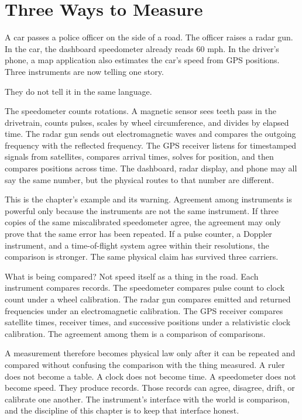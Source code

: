 \chapter{Three Ways to Measure}
\label{chap:three-ways-to-measure}


\begin{chapteressay}

A car passes a police officer on the side of a road. The officer raises a radar
gun. In the car, the dashboard speedometer already reads 60 mph. In the
driver's phone, a map application also estimates the car's speed from GPS
positions. Three instruments are now telling one story.

They do not tell it in the same language.

The speedometer counts rotations. A magnetic sensor sees teeth pass in the
drivetrain, counts pulses, scales by wheel circumference, and divides by elapsed
time. The radar gun sends out electromagnetic waves and compares the outgoing
frequency with the reflected frequency. The GPS receiver listens for timestamped
signals from satellites, compares arrival times, solves for position, and then
compares positions across time. The dashboard, radar display, and phone may all
say the same number, but the physical routes to that number are different.

This is the chapter's example and its warning. Agreement among instruments is
powerful only because the instruments are not the same instrument. If three
copies of the same miscalibrated speedometer agree, the agreement may only
prove that the same error has been repeated. If a pulse counter, a Doppler
instrument, and a time-of-flight system agree within their resolutions, the
comparison is stronger. The same physical claim has survived three carriers.

What is being compared? Not speed itself as a thing in the road. Each
instrument compares records. The speedometer compares pulse count to clock
count under a wheel calibration. The radar gun compares emitted and returned
frequencies under an electromagnetic calibration. The GPS receiver compares
satellite times, receiver times, and successive positions under a relativistic
clock calibration. The agreement among them is a comparison of comparisons.

A measurement therefore becomes physical law only after it can be repeated and
compared without confusing the comparison with the thing measured. A ruler does
not become a table. A clock does not become time. A speedometer does not become
speed. They produce records. Those records can agree, disagree, drift, or
calibrate one another. The instrument's interface with the world is comparison,
and the discipline of this chapter is to keep that interface honest.


\end{chapteressay}
